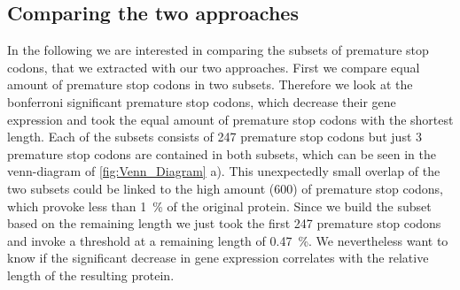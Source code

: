 \subsection{Comparing the two approaches}
In the following we are interested in comparing the subsets of premature stop codons, that we extracted with our two approaches. First we compare equal amount of premature stop codons in two subsets. Therefore we look at the bonferroni significant premature stop codons, which decrease their gene expression and took the equal amount of premature stop codons with the shortest length. Each of the subsets consists of 247 premature stop codons but just 3 premature stop codons are contained in both subsets, which can be seen in the venn-diagram of \autoref{fig:Venn_Diagram} a). This unexpectedly small overlap of the two subsets could be linked to the high amount (600) of premature stop codons, which provoke less than \SI{1}{\percent} of the original protein. Since we build the subset based on the remaining length we just took the first 247 premature stop codons and invoke a threshold at a remaining length of \SI{0.47}{\percent}. We nevertheless want to know if the significant decrease in gene expression correlates with the relative length of the resulting protein. 

